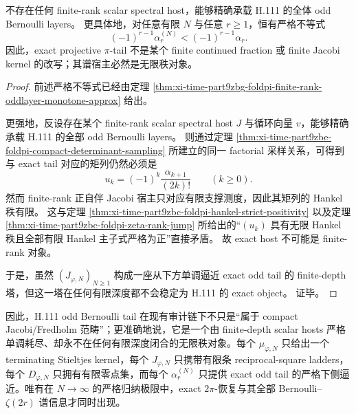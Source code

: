 \begin{theorem}\label{thm:xi-time-part9zbg-foldpi-finite-depth-exactness-obstruction}
不存在任何 finite-rank scalar spectral host，能够精确承载 H.111 的全体 odd Bernoulli layers。
更具体地，对任意有限 \(N\) 与任意 \(r\ge 1\)，恒有严格不等式
\[
(-1)^{r-1}\alpha_r^{(N)}<(-1)^{r-1}\alpha_r.
\]
因此，exact projective \(\pi\)-tail 不是某个 finite continued fraction 或 finite Jacobi kernel 的改写；其谱宿主必然是无限秩对象。
\end{theorem}
\begin{proof}
前述严格不等式已经由定理 \ref{thm:xi-time-part9zbg-foldpi-finite-rank-oddlayer-monotone-approx} 给出。

更强地，反设存在某个 finite-rank scalar spectral host \(J\) 与循环向量 \(v\)，能够精确承载 H.111 的全部 odd Bernoulli layers。
则通过定理 \ref{thm:xi-time-part9zbe-foldpi-compact-determinant-sampling} 所建立的同一 factorial 采样关系，可得到与 exact tail 对应的矩列仍然必须是
\[
u_k=(-1)^k\frac{\alpha_{k+1}}{(2k)!}
\qquad (k\ge 0).
\]
然而 finite-rank 正自伴 Jacobi 宿主只对应有限支撑测度，因此其矩列的 Hankel 秩有限。
这与定理 \ref{thm:xi-time-part9zbc-foldpi-hankel-strict-positivity} 以及定理 \ref{thm:xi-time-part9zbc-foldpi-zeta-rank-jump} 所给出的“\((u_k)\) 具有无限 Hankel 秩且全部有限 Hankel 主子式严格为正”直接矛盾。
故 exact host 不可能是 finite-rank 对象。

于是，虽然 \((J_{\varphi,N})_{N\ge 1}\) 构成一座从下方单调逼近 exact odd tail 的 finite-depth 塔，但这一塔在任何有限深度都不会稳定为 H.111 的 exact object。
证毕。
\end{proof}

\noindent
因此，H.111 odd Bernoulli tail 在现有审计链下不只是“属于 compact Jacobi/Fredholm 范畴”；更准确地说，它是一个由 finite-depth scalar hosts 严格单调耗尽、却永不在任何有限深度闭合的无限秩对象。每个 \(\mu_{\varphi,N}\) 只给出一个 terminating Stieltjes kernel，每个 \(J_{\varphi,N}\) 只携带有限条 reciprocal-square ladders，每个 \(D_{\varphi,N}\) 只拥有有限零点集，而每个 \(\alpha_r^{(N)}\) 只提供 exact odd tail 的严格下侧逼近。唯有在 \(N\to\infty\) 的严格归纳极限中，exact \(2\pi\)-恢复与其全部 Bernoulli--\(\zeta(2r)\) 谱信息才同时出现。

\endinput
